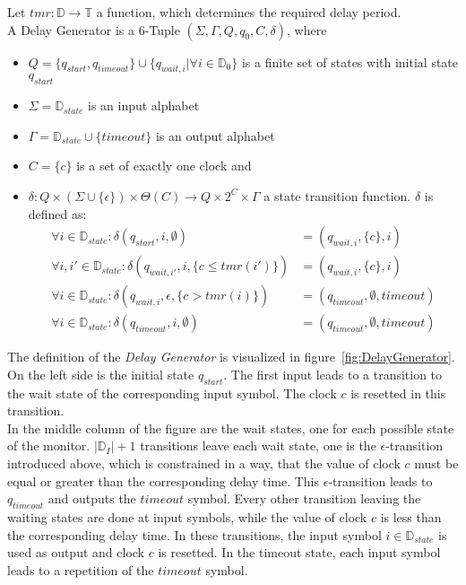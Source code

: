 		\begin{definition}
			Let $tmr: \mathbb{D}\rightarrow \mathbb{T}$ a function, which determines the required delay period.\\
			A Delay Generator is a 6-Tuple $(\Sigma, \Gamma, Q, q_0, C, \delta)$, where
			\begin{itemize}
				\item
					$Q = \{q_{start}, q_{timeout}\}\cup\{q_{wait,i} | \forall i\in \mathbb{D}_{0}\}$ is a finite set of states with initial state $q_{start}$
				\item
					$\Sigma = \mathbb D_{state}$ is an input alphabet
				\item
					$\Gamma = \mathbb D_{state} \cup \{timeout\}$ is an output alphabet
				\item
					$C=\{c\}$ is a set of exactly one clock and
				\item
					$\delta:Q\times(\Sigma\cup\{\epsilon\})\times\Theta(C)\rightarrow Q\times 2^C\times\Gamma$ a state transition function. $\delta$ is defined as:
					\begin{align}
						\forall i\in \mathbb{D}_{state}:\delta(q_{start}, i, \emptyset) &= (q_{wait,i}, \{c\}, i)\\
						\forall i, i'\in \mathbb{D}_{state}:\delta(q_{wait, i'}, i, \{c \leq tmr(i')\}) &= (q_{wait,i}, \{c\}, i)\\
						\forall i \in \mathbb{D}_{state}:\delta(q_{wait, i}, \epsilon, \{c > tmr(i)\}) &= (q_{timeout}, \emptyset, timeout)\\
						\forall i \in \mathbb{D}_{state}:\delta(q_{timeout}, i, \emptyset) &= (q_{timeout}, \emptyset, timeout)
					\end{align}
			\end{itemize}
		\end{definition}
		The definition of the \textit{Delay Generator} is visualized in figure~\ref{fig:DelayGenerator}. On the left side is the initial state $q_{start}$. The first input leads to a transition to the wait state of the corresponding input symbol. The clock $c$ is resetted in this transition.\\
		In the middle column of the figure are the wait states, one for each possible state of the monitor. $|\mathbb{D}_I|+1$ transitions leave each wait state, one is the $\epsilon$-transition introduced above, which is constrained in a way, that the value of clock $c$ must be equal or greater than the corresponding delay time. This $\epsilon$-transition leads to $q_{timeout}$ and outputs the $timeout$ symbol. Every other transition leaving the waiting states are done at input symbols, while the value of clock $c$ is less than the corresponding delay time. In these transitions, the input symbol $i\in \mathbb D_{state}$ is used as output and clock $c$ is resetted. In the timeout state, each input symbol leads to a repetition of the $timeout$ symbol.
	
